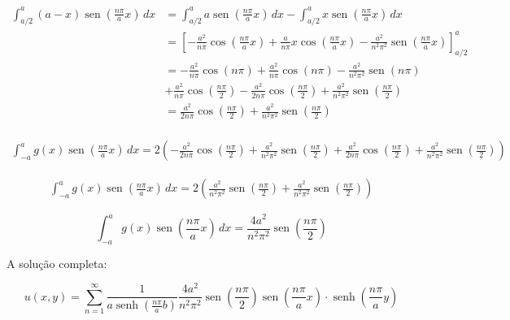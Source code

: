 \documentclass[12pt, a4paper, portuguese]{fphw}
\DeclareMathOperator{\sen}{sen}
\DeclareMathOperator{\senh}{senh}
\begin{document}
$$
\begin{aligned}
\int_{a/2}^{a} \left( a - x \right) \sen \left( \frac{n \pi}{a} x \right)\, dx &= \int_{a/2}^{a} a \sen \left( \frac{n \pi}{a} x \right)\, dx - \int_{a/2}^{a} x \sen \left( \frac{n \pi}{a} x \right)\, dx \\
&=
\left[
-\frac{a^2}{n\pi} \cos \left( \frac{n \pi}{a} x \right)
+\frac{a}{n \pi}x
\cos \left( \frac{n\pi}{a}x \right)
-
\frac{a^2}{n^2 \pi^2}
\sen \left( \frac{n\pi}{a}x \right)
\right]_{a/2}^a \\
&=
-\frac{a^2}{n\pi} \cos \left( n \pi \right)
+\frac{a^2}{n \pi}
\cos \left( n\pi \right)
-
\frac{a^2}{n^2 \pi^2}
\sen \left( n\pi \right) \\
&+
\frac{a^2}{n\pi} \cos \left( \frac{n \pi}{2} \right)
-\frac{a^2}{2n \pi}
\cos \left( \frac{n\pi}{2} \right)
+
\frac{a^2}{n^2 \pi^2}
\sen \left( \frac{n\pi}{2} \right) \\
&=
\frac{a^2}{2n\pi} \cos \left( \frac{n \pi}{2} \right)
+
\frac{a^2}{n^2 \pi^2}
\sen \left( \frac{n\pi}{2} \right) \\
\end{aligned}
$$

$$
\begin{aligned}
\int_{-a}^{a} g(x) \sen \left( \frac{n \pi}{a} x \right)\, dx
=
2
\left(
-\frac{a^2}{2n \pi}
\cos \left( \frac{n\pi}{2} \right)
+
\frac{a^2}{n^2 \pi^2}
\sen \left( \frac{n\pi}{2} \right)
+
\frac{a^2}{2n\pi} \cos \left( \frac{n \pi}{2} \right)
+
\frac{a^2}{n^2 \pi^2}
\sen \left( \frac{n\pi}{2} \right)
\right)
\end{aligned}
$$

$$
\begin{aligned}
\int_{-a}^{a} g(x) \sen \left( \frac{n \pi}{a} x \right)\, dx
=
2
\left(
\frac{a^2}{n^2 \pi^2}
\sen \left( \frac{n\pi}{2} \right)
+
\frac{a^2}{n^2 \pi^2}
\sen \left( \frac{n\pi}{2} \right)
\right)
\end{aligned}
$$

$$
\int_{-a}^{a} g(x) \sen \left( \frac{n \pi}{a} x \right)\, dx
=
\frac{4a^2}{n^2 \pi^2}
\sen \left( \frac{n\pi}{2} \right)
$$

A solução completa:

$$
u(x, y) = \sum_{n=1}^{\infty}
\frac{1}{a \senh \left(
	\frac{n \pi}{a} b
	\right)} \frac{4a^2}{n^2 \pi^2} \sen \left( \frac{n\pi}{2} \right)
\sen \left( \frac{n \pi}{a} x \right)
\cdot
\senh \left(
\frac{n \pi}{a} y
\right)
$$
\end{document}
